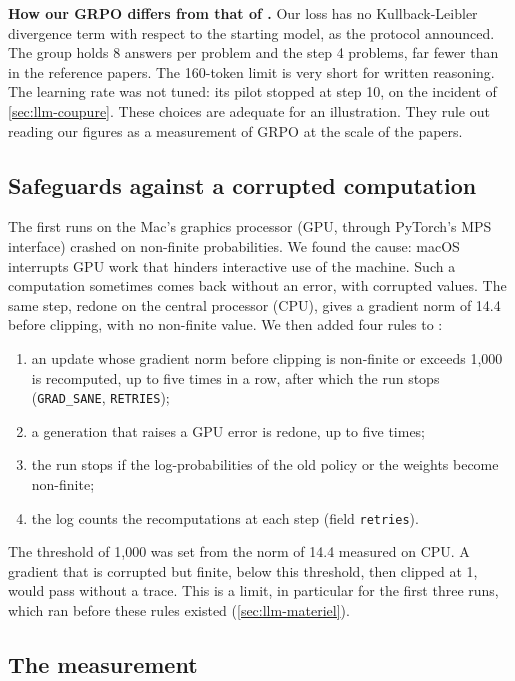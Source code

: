 \begin{notebox}
\textbf{How our GRPO differs from that of \textcite{shao2024deepseekmath}.} Our loss has no
Kullback-Leibler divergence term with respect to the starting model, as the protocol
announced. The group holds 8 answers per problem and the step 4 problems, far fewer than in the
reference papers. The 160-token limit is very short for written reasoning. The learning rate was not
tuned: its pilot stopped at step 10, on the incident of \cref{sec:llm-coupure}. These choices are
adequate for an illustration. They rule out reading our figures as a measurement of GRPO at the
scale of the papers.
\end{notebox}

\subsection{Safeguards against a corrupted computation}

The first runs on the Mac's graphics processor (GPU, through PyTorch's MPS interface) crashed on
non-finite probabilities. We found the cause: macOS interrupts GPU work
that hinders interactive use of the machine. Such a computation sometimes comes back without an
error, with corrupted values. The same step, redone on the central processor (CPU), gives a gradient
norm of 14.4 before clipping, with no non-finite value. We then added four rules to :
\begin{enumerate}
  \item an update whose gradient norm before clipping is non-finite or exceeds 1,000 is recomputed,
        up to five times in a row, after which the run stops (\texttt{GRAD\_SANE},
        \texttt{RETRIES});
  \item a generation that raises a GPU error is redone, up to five times;
  \item the run stops if the log-probabilities of the old policy or the weights become non-finite;
  \item the log counts the recomputations at each step (field \texttt{retries}).
\end{enumerate}
The threshold of 1,000 was set from the norm of 14.4 measured on CPU. A gradient that is corrupted but
finite, below this threshold, then clipped at 1, would pass without a trace. This is a limit, in
particular for the first three runs, which ran before these rules existed (\cref{sec:llm-materiel}).

\subsection{The measurement}

